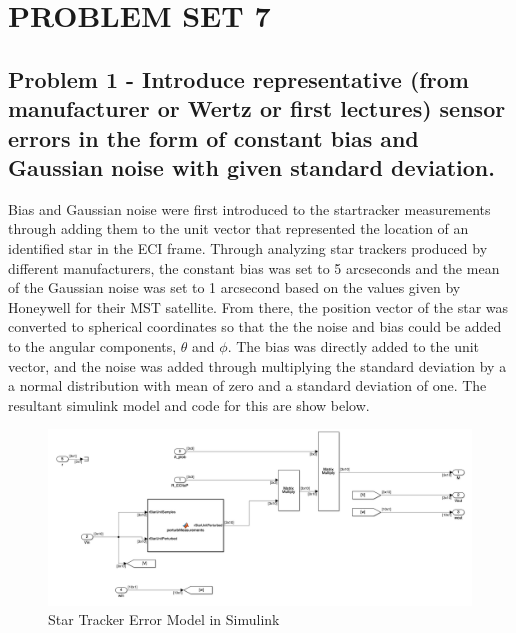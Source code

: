 \section{\Large PROBLEM SET 7}

\subsection{Problem 1 - Introduce representative (from manufacturer or Wertz or first lectures) sensor errors in the form of constant bias and Gaussian noise with given standard deviation.}

Bias and Gaussian noise were first introduced to the startracker measurements through adding them to the unit vector that represented the location of an identified star in the ECI frame. Through analyzing star trackers produced by different manufacturers, the constant bias was set to 5 arcseconds and the mean of the Gaussian noise was set to 1 arcsecond based on the values given by Honeywell for their MST satellite. From there, the position vector of the star was converted to spherical coordinates so that the the noise and bias could be added to the angular components, $\theta$ and $\phi$. The bias was directly added to the unit vector, and the noise was added through multiplying the standard deviation by a a normal distribution with mean of zero and a standard deviation of one. The resultant simulink model and code for this are show below.

\begin{figure}[H]
    \centering
    \captionsetup{ justification = centering }
    \includegraphics[width = 15cm]{Images/PS7/starTrackerErrorSimulink.png}
    \caption{Star Tracker Error Model in Simulink}
    \label{fig:starTrackerErrorSimulink}
\end{figure}

